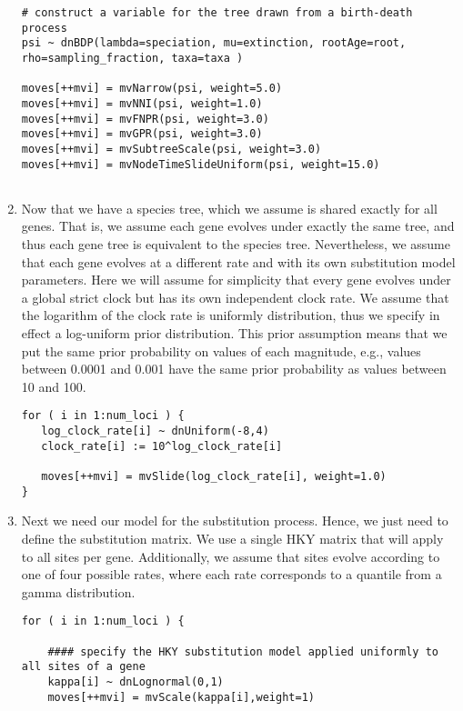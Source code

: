 \begin{enumerate}
{\begin{snugshade*}
\begin{lstlisting}
# construct a variable for the tree drawn from a birth-death process
psi ~ dnBDP(lambda=speciation, mu=extinction, rootAge=root, rho=sampling_fraction, taxa=taxa )

moves[++mvi] = mvNarrow(psi, weight=5.0)
moves[++mvi] = mvNNI(psi, weight=1.0)
moves[++mvi] = mvFNPR(psi, weight=3.0)
moves[++mvi] = mvGPR(psi, weight=3.0)
moves[++mvi] = mvSubtreeScale(psi, weight=3.0)
moves[++mvi] = mvNodeTimeSlideUniform(psi, weight=15.0)


\end{lstlisting}
\end{snugshade*}}
\item Now that we have a species tree, which we assume is shared exactly for all genes.
That is, we assume each gene evolves under exactly the same tree, and thus each gene tree is equivalent to the species tree.
Nevertheless, we assume that each gene evolves at a different rate and with its own substitution model parameters.
Here we will assume for simplicity that every gene evolves under a global strict clock but has its own independent clock rate.
We assume that the logarithm of the clock rate is uniformly distribution, thus we specify in effect a log-uniform prior distribution.
This prior assumption means that we put the same prior probability on values of each magnitude, e.g., values between 0.0001 and 0.001 have the same prior probability as values between 10 and 100.
{\tt \begin{snugshade*}
\begin{lstlisting}
for ( i in 1:num_loci ) { 
   log_clock_rate[i] ~ dnUniform(-8,4)
   clock_rate[i] := 10^log_clock_rate[i]
   
   moves[++mvi] = mvSlide(log_clock_rate[i], weight=1.0)
}
\end{lstlisting}
\end{snugshade*}}

\item Next we need our model for the substitution process. 
Hence, we just need to define the substitution matrix. 
We use a single HKY matrix that will apply to all sites per gene.
Additionally, we assume that sites evolve according to one of four possible rates, where each rate corresponds to a quantile from a gamma distribution.
{\tt \begin{snugshade*}
\begin{lstlisting}
for ( i in 1:num_loci ) {

    #### specify the HKY substitution model applied uniformly to all sites of a gene
    kappa[i] ~ dnLognormal(0,1)
    moves[++mvi] = mvScale(kappa[i],weight=1)


\end{lstlisting}
\end{snugshade*}}
\end{enumerate}
